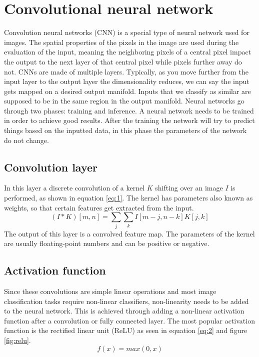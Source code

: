 \section{Convolutional neural network}
Convolution neural networks (CNN) is a special type of neural network used for images. The spatial properties of the pixels in the image are used during the evaluation of the input, meaning the neighboring pixels of a central pixel impact the output to the next layer of that central pixel while pixels further away do not.
CNNs are made of multiple layers. Typically, as you move further from the input layer to the output layer the dimensionality reduces, we can say the input gets mapped on a desired output manifold. Inputs that we classify as similar are supposed to be in the same region in the output manifold. Neural networks go through two phases: training and inference. A neural network needs to be trained in order to achieve good results. After the training the network will try to predict things based on the inputted data, in this phase the parameters of the network do not change.

\subsection{Convolution layer}
In this layer a discrete convolution of a kernel $K$ shifting over an image $I$ is performed, as shown in equation \ref{eq:1}. The kernel has parameters also known as weights, so that certain features get extracted from the input.
\begin{equation} \label{eq:1}
  (I*K)[m,n]=\sum_j\sum_k I[m-j,n-k]K[j,k]
\end{equation}
The output of this layer is a convolved feature map. The parameters of the kernel are usually floating-point numbers and can be positive or negative.

\subsection{Activation function}
Since these convolutions are simple linear operations and most image classification tasks require non-linear classifiers, non-linearity needs to be added to the neural network. This is achieved through adding a non-linear activation function after a convolution or fully connected layer. The most popular activation function is the rectified linear unit (ReLU) as seen in equation \ref{eq:2} and figure \ref{fig:relu}.
\begin{equation} \label{eq:2}
  f(x)=max(0,x)
\end{equation}

